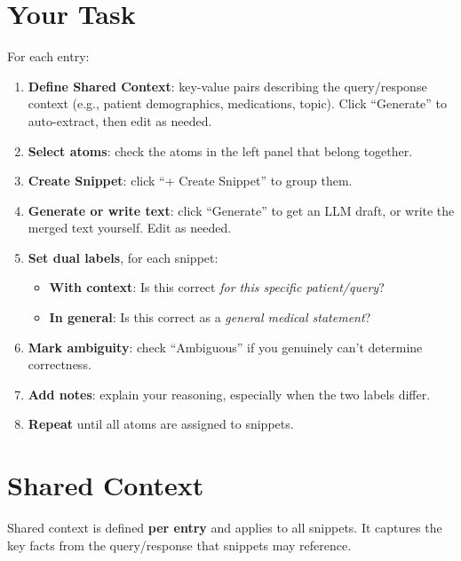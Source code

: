 \documentclass{article}
\begin{document}
\section{Your Task}
\label{sec:task}

For each entry:
\begin{enumerate}[leftmargin=*,itemsep=2pt]
    \item \textbf{Define Shared Context}: key-value pairs describing the query/response context (e.g., patient demographics, medications, topic). Click ``Generate'' to auto-extract, then edit as needed.
    \item \textbf{Select atoms}: check the atoms in the left panel that belong together.
    \item \textbf{Create Snippet}: click ``+ Create Snippet'' to group them.
    \item \textbf{Generate or write text}: click ``Generate'' to get an LLM draft, or write the merged text yourself. Edit as needed.
    \item \textbf{Set dual labels}, for each snippet:
        \begin{itemize}[leftmargin=*,itemsep=1pt]
            \item \textbf{With context}: Is this correct \textit{for this specific patient/query}?
            \item \textbf{In general}: Is this correct as a \textit{general medical statement}?
        \end{itemize}
    \item \textbf{Mark ambiguity}: check ``Ambiguous'' if you genuinely can't determine correctness.
    \item \textbf{Add notes}: explain your reasoning, especially when the two labels differ.
    \item \textbf{Repeat} until all atoms are assigned to snippets.
\end{enumerate}


\section{Shared Context}
\label{sec:shared-context}

Shared context is defined \textbf{per entry} and applies to all snippets. It captures the key facts from the query/response that snippets may reference.
\end{document}

